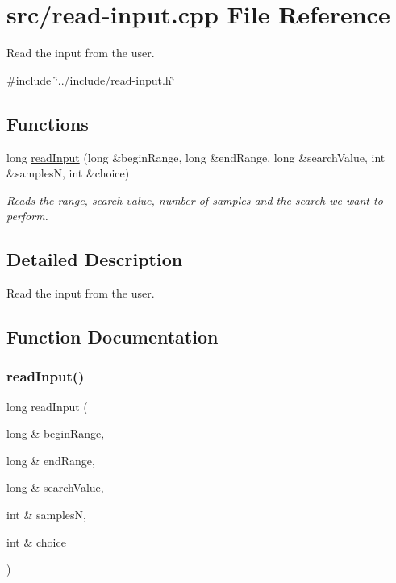 \hypertarget{read-input_8cpp}{}\section{src/read-\/input.cpp File Reference}
\label{read-input_8cpp}


Read the input from the user.  


{\ttfamily \#include \char`\"{}../include/read-\/input.\+h\char`\"{}}\newline
\subsection*{Functions}
\begin{DoxyCompactItemize}
\item 
long \mbox{\hyperlink{read-input_8cpp_accc8aed23bef5f738976b4cf30eae03a}{read\+Input}} (long \&begin\+Range, long \&end\+Range, long \&search\+Value, int \&samplesN, int \&choice)
\begin{DoxyCompactList}\small\item\em Reads the range, search value, number of samples and the search we want to perform. \end{DoxyCompactList}\end{DoxyCompactItemize}


\subsection{Detailed Description}
Read the input from the user. 



\subsection{Function Documentation}
\mbox{\label{read-input_8cpp_accc8aed23bef5f738976b4cf30eae03a}} 
\subsubsection{\texorpdfstring{readInput()}{readInput()}}
{\footnotesize\ttfamily long read\+Input (\begin{DoxyParamCaption}\item[{long \&}]{begin\+Range,  }\item[{long \&}]{end\+Range,  }\item[{long \&}]{search\+Value,  }\item[{int \&}]{samplesN,  }\item[{int \&}]{choice }\end{DoxyParamCaption})}



